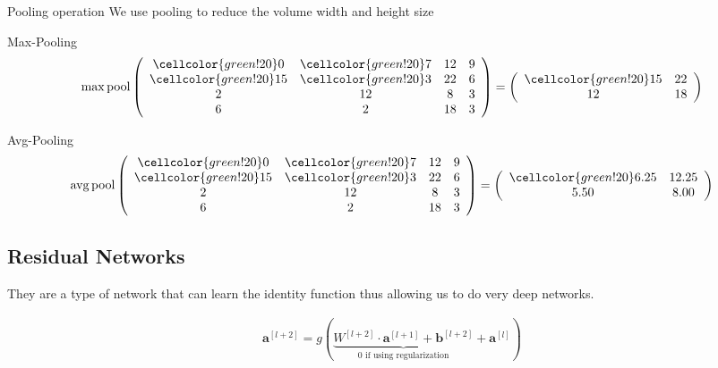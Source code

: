 \begin{frame}{Pooling operation}
    We use pooling to reduce the volume width and height size
    \begin{block}{Max-Pooling}
        \begin{align*}
            \operatorname{max\,pool}
            \left(
            \begin{array}{cccc}
                \cellcolor{green!20} 0 & \cellcolor{green!20} 7 & 12 &  9 \\
                \cellcolor{green!20}15 & \cellcolor{green!20} 3 & 22 &  6 \\
                 2 & 12 &  8 &  3 \\
                 6 &  2 & 18 &  3 \\
            \end{array}
            \right)
            =
            \left(
            \begin{array}{cc}
                \cellcolor{green!20}15 & 22 \\
                12 & 18
            \end{array}
            \right)
        \end{align*}
    \end{block}

    \begin{block}{Avg-Pooling}
        \begin{align*}
            \operatorname{avg\,pool}
            \left(
            \begin{array}{cccc}
                \cellcolor{green!20} 0 & \cellcolor{green!20} 7 & 12 &  9 \\
                \cellcolor{green!20}15 & \cellcolor{green!20} 3 & 22 &  6 \\
                 2 & 12 &  8 &  3 \\
                 6 &  2 & 18 &  3 \\
            \end{array}
            \right)
            =
            \left(
            \begin{array}{cc}
                \cellcolor{green!20}6.25 & 12.25 \\
                5.50 & 8.00
            \end{array}
            \right)
        \end{align*}
    \end{block}
\end{frame}

\subsection{Residual Networks}
\begin{frame}{\insertsubsec}
    They are a type of network that can learn the identity function thus allowing us to do
    very deep networks.
    

    \begin{align*}
        \bm{a}^{[l+2]} = 
        g(\underbrace{W^{[l+2]} \cdot \bm{a}^{[l + 1]} + \bm{b}^{[l + 2]}}
        _{0 \text{ if using regularization}} + \bm{a}^{[l]})
    \end{align*}
\end{frame}

